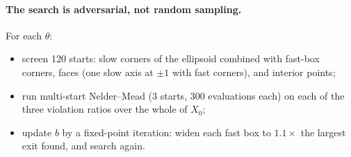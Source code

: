 \documentclass[11pt]{article}
\begin{document}
\paragraph{The search is adversarial, not random sampling.} For each $\theta$:
\begin{itemize}
\item screen 120 starts: slow corners of the ellipsoid combined with fast-box corners, faces (one slow axis at $\pm1$ with fast corners), and interior points;
\item run multi-start Nelder--Mead (3 starts, 300 evaluations each) on each of the three violation ratios over the whole of $X_0$;
\item update $b$ by a fixed-point iteration: widen each fast box to $1.1\times$ the largest exit found, and search again.
\end{itemize}
\end{document}
